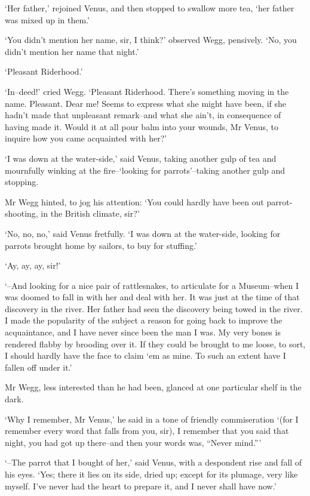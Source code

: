 ‘Her father,’ rejoined Venus, and then stopped to swallow more tea, ‘her
father was mixed up in them.’

‘You didn’t mention her name, sir, I think?’ observed Wegg, pensively.
‘No, you didn’t mention her name that night.’

‘Pleasant Riderhood.’

‘In--deed!’ cried Wegg. ‘Pleasant Riderhood. There’s something moving in
the name. Pleasant. Dear me! Seems to express what she might have
been, if she hadn’t made that unpleasant remark--and what she ain’t,
in consequence of having made it. Would it at all pour balm into your
wounds, Mr Venus, to inquire how you came acquainted with her?’

‘I was down at the water-side,’ said Venus, taking another gulp of
tea and mournfully winking at the fire--‘looking for parrots’--taking
another gulp and stopping.

Mr Wegg hinted, to jog his attention: ‘You could hardly have been out
parrot-shooting, in the British climate, sir?’

‘No, no, no,’ said Venus fretfully. ‘I was down at the water-side,
looking for parrots brought home by sailors, to buy for stuffing.’

‘Ay, ay, ay, sir!’

‘--And looking for a nice pair of rattlesnakes, to articulate for a
Museum--when I was doomed to fall in with her and deal with her. It was
just at the time of that discovery in the river. Her father had seen the
discovery being towed in the river. I made the popularity of the subject
a reason for going back to improve the acquaintance, and I have never
since been the man I was. My very bones is rendered flabby by brooding
over it. If they could be brought to me loose, to sort, I should hardly
have the face to claim ‘em as mine. To such an extent have I fallen off
under it.’

Mr Wegg, less interested than he had been, glanced at one particular
shelf in the dark.

‘Why I remember, Mr Venus,’ he said in a tone of friendly commiseration
‘(for I remember every word that falls from you, sir), I remember that
you said that night, you had got up there--and then your words was,
“Never mind.”’

‘--The parrot that I bought of her,’ said Venus, with a despondent rise
and fall of his eyes. ‘Yes; there it lies on its side, dried up; except
for its plumage, very like myself. I’ve never had the heart to prepare
it, and I never shall have now.’


